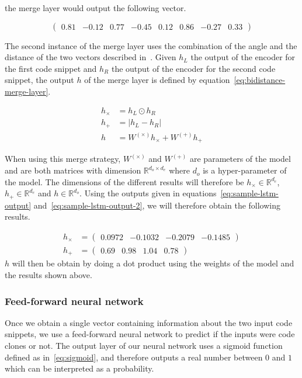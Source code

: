 the merge layer would output the following vector.

\begin{equation}
  \begin{pmatrix}
    0.81 & -0.12 & 0.77 & -0.45 & 0.12 & 0.86 & -0.27 & 0.33
  \end{pmatrix}
\end{equation}

The second instance of the merge layer uses the combination of the angle and the
distance of the two vectors described in~\cite{DBLP:journals/corr/TaiSM15}.
Given $h_L$ the output of the encoder for the first code snippet and $h_R$ the
output of the encoder for the second code snippet, the output $h$ of the merge
layer is defined by equation~\ref{eq:bidistance-merge-layer}.

\begin{align}
  \label{eq:bidistance-merge-layer}
  h_\times &= h_L \odot h_R\\
  h_+ &= |h_L - h_R| \nonumber\\
  h &= W^{(\times)}h_\times + W^{(+)}h_+ \nonumber
\end{align}

When using this merge strategy, $W^{(\times)}$ and $W^{(+)}$ are parameters of
the model and are both matrices with dimension $\mathbb{R}^{d_o\times d_e}$
where $d_o$ is a hyper-parameter of the model. The dimensions of the different
results will therefore be $h_\times \in \mathbb{R}^{d_e}$, $h_+ \in
\mathbb{R}^{d_e}$ and $h \in \mathbb{R}^{d_o}$. Using the outputs given in
equations~\ref{eq:sample-lstm-output} and~\ref{eq:sample-lstm-output-2}, we will
therefore obtain the following results.

\begin{align*}
  h_\times &= \begin{pmatrix}0.0972 & -0.1032 & -0.2079 & -0.1485\end{pmatrix}\\
  h_+ &= \begin{pmatrix}0.69 & 0.98 & 1.04 & 0.78\end{pmatrix}
\end{align*}
$h$ will then be obtain by doing a dot product using the weights of the model
and the results shown above.
\subsubsection{Feed-forward neural network}
Once we obtain a single vector containing information about the two input code
snippets, we use a feed-forward neural network to predict if the inputs were
code clones or not. The output layer of our neural network uses a sigmoid
function defined as in~\ref{eq:sigmoid}, and therefore outputs a real number
between $0$ and $1$ which can be interpreted as a probability.

